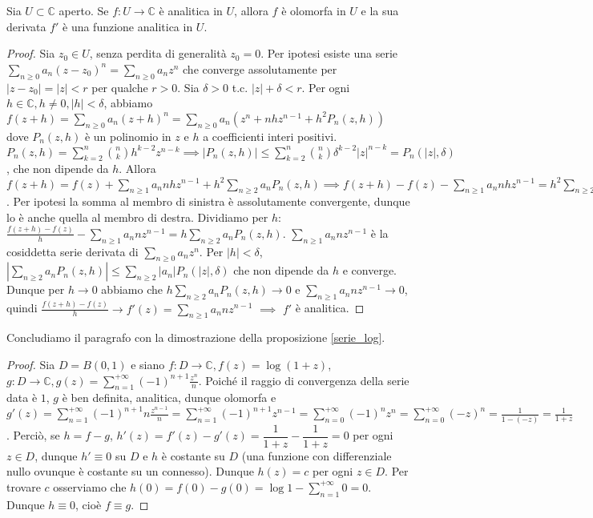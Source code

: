 \begin{thm}
  Sia $U \subset \mathbb{C}$ aperto. Se $f:U \longrightarrow \mathbb{C}$ è analitica in $U$, allora $f$ è olomorfa in $U$ e la sua derivata $f'$ è una funzione analitica in $U$.
\end{thm}

\begin{proof}
  Sia $z_0 \in U$, senza perdita di generalità $z_0=0$. Per ipotesi esiste una serie $\displaystyle \sum_{n \ge 0} a_n(z-z_0)^n=\sum_{n \ge 0} a_nz^n$ che converge assolutamente per $|z-z_0|=|z|<r$ per qualche $r>0$. Sia $\delta>0$ t.c. $|z|+\delta<r$.
  Per ogni $h \in \mathbb{C}, h\not=0, |h|<\delta$, abbiamo $\displaystyle f(z+h)=\sum_{n \ge 0} a_n(z+h)^n=\sum_{n \ge 0} a_n(z^n+nhz^{n-1}+h^2P_n(z, h))$ dove $P_n(z, h)$ è un polinomio in $z$ e $h$ a coefficienti interi positivi.
  $\displaystyle P_n(z, h)=\sum_{k=2}^n \binom{n}{k}h^{k-2}z^{n-k} \implies |P_n(z, h)| \le \sum_{k=2}^n \binom{n}{k} \delta^{k-2}|z|^{n-k}=P_n(|z|, \delta)$, che non dipende da $h$.
  Allora $\displaystyle f(z+h)=f(z)+\sum_{n \ge 1} a_nnhz^{n-1}+h^2\sum_{n \ge 2}a_nP_n(z, h) \implies f(z+h)-f(z)-\sum_{n \ge 1} a_nnhz^{n-1}=h^2\sum_{n \ge 2} a_nP_n(z, h)$. Per ipotesi la somma al membro di sinistra è assolutamente convergente, dunque lo è anche quella al membro di destra.
  Dividiamo per $h$: $\displaystyle \frac{f(z+h)-f(z)}{h}-\sum_{n \ge 1}a_nnz^{n-1}=h\sum_{n \ge 2} a_nP_n(z, h)$. $\displaystyle \sum_{n \ge 1}a_nnz^{n-1}$ è la cosiddetta serie derivata di $\displaystyle \sum_{n \ge 0}a_nz^n$.
  Per $|h|<\delta$, $\displaystyle \left|\sum_{n \ge 2} a_nP_n(z, h)\right| \le \sum_{n \ge 2} |a_n|P_n(|z|, \delta)$ che non dipende da $h$ e converge.
  Dunque per $h \longrightarrow 0$ abbiamo che $\displaystyle h\sum_{n \ge 2} a_nP_n(z, h) \longrightarrow 0$ e $\displaystyle \sum_{n \ge 1} a_nnz^{n-1} \longrightarrow 0$, quindi $\displaystyle \frac{f(z+h)-f(z)}{h} \longrightarrow f'(z)=\sum_{n \ge 1} a_nnz^{n-1}$ $\implies$ $f'$ è analitica.
\end{proof}

Concludiamo il paragrafo con la dimostrazione della proposizione \ref{serie_log}.

\begin{proof}
  Sia $D=B(0, 1)$ e siano $f:D \longrightarrow \mathbb{C}, f(z)=\log(1+z)$, $\displaystyle g:D \longrightarrow \mathbb{C}, g(z)=\sum_{n=1}^{+\infty} (-1)^{n+1}\frac{z^n}{n}$.
  Poiché il raggio di convergenza della serie data è $1$, $g$ è ben definita, analitica, dunque olomorfa e $\displaystyle g'(z)=\sum_{n=1}^{+\infty} (-1)^{n+1}n\frac{z^{n-1}}{n}=\sum_{n=1}^{+\infty} (-1)^{n+1}z^{n-1}=\sum_{n=0}^{+\infty} (-1)^nz^n=\sum_{n=0}^{+\infty} (-z)^n=\frac{1}{1-(-z)}=\frac{1}{1+z}$.
  Perciò, se $h=f-g$, $h'(z)=f'(z)-g'(z)=\dfrac{1}{1+z}-\dfrac{1}{1+z}=0$ per ogni $z \in D$, dunque $h' \equiv 0$ su $D$ e $h$ è costante su $D$ (una funzione con differenziale nullo ovunque è costante su un connesso). Dunque $h(z)=c$ per ogni $z \in D$.
  Per trovare $c$ osserviamo che $\displaystyle h(0)=f(0)-g(0)=\log{1}-\sum_{n=1}^{+\infty} 0=0$. Dunque $h \equiv 0$, cioè $f \equiv g$.
\end{proof}
